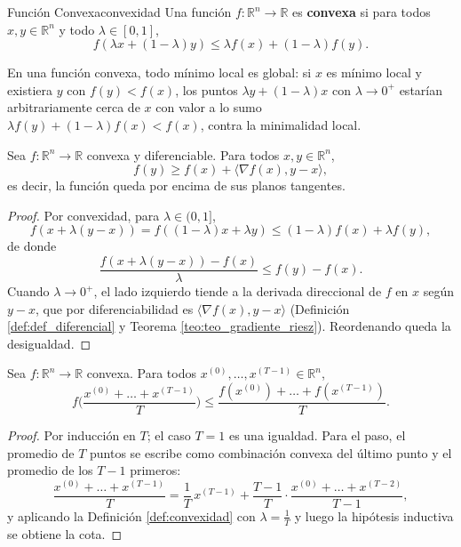 \documentclass[11pt, a4paper]{article}
\begin{document}
\begin{definicion}{Función Convexa}{convexidad}
Una función $f: \mathbb{R}^n \to \mathbb{R}$ es \textbf{convexa} si para todos $x, y \in \mathbb{R}^n$ y todo $\lambda \in [0, 1]$,
\[
f(\lambda x + (1 - \lambda) y) \le \lambda f(x) + (1 - \lambda) f(y).
\]
\end{definicion}

\obs En una función convexa, todo mínimo local es global: si $x$ es mínimo local y existiera $y$ con $f(y) < f(x)$, los puntos $\lambda y + (1-\lambda) x$ con $\lambda \to 0^+$ estarían arbitrariamente cerca de $x$ con valor a lo sumo $\lambda f(y) + (1-\lambda) f(x) < f(x)$, contra la minimalidad local.

\begin{lema}\label{lem_tangente}
Sea $f: \mathbb{R}^n \to \mathbb{R}$ convexa y diferenciable. Para todos $x, y \in \mathbb{R}^n$,
\[
f(y) \ge f(x) + \langle \nabla f(x), y - x \rangle,
\]
es decir, la función queda por encima de sus planos tangentes.
\end{lema}

\begin{proof}
Por convexidad, para $\lambda \in (0, 1]$,
\[
f(x + \lambda (y - x)) = f((1-\lambda) x + \lambda y) \le (1 - \lambda) f(x) + \lambda f(y),
\]
de donde
\[
\frac{f(x + \lambda (y - x)) - f(x)}{\lambda} \le f(y) - f(x).
\]
Cuando $\lambda \to 0^+$, el lado izquierdo tiende a la derivada direccional de $f$ en $x$ según $y - x$, que por diferenciabilidad es $\langle \nabla f(x), y - x \rangle$ (Definición \ref{def:def_diferencial} y Teorema \ref{teo:teo_gradiente_riesz}). Reordenando queda la desigualdad.
\end{proof}

\begin{lema}\label{lem_jensen}
Sea $f: \mathbb{R}^n \to \mathbb{R}$ convexa. Para todos $x^{(0)}, \dots, x^{(T-1)} \in \mathbb{R}^n$,
\[
f \Bigg( \frac{x^{(0)} + \dots + x^{(T-1)}}{T} \Bigg) \le \frac{f(x^{(0)}) + \dots + f(x^{(T-1)})}{T}.
\]
\end{lema}

\begin{proof}
Por inducción en $T$; el caso $T = 1$ es una igualdad. Para el paso, el promedio de $T$ puntos se escribe como combinación convexa del último punto y el promedio de los $T - 1$ primeros:
\[
\frac{x^{(0)} + \dots + x^{(T-1)}}{T} = \frac{1}{T} \, x^{(T-1)} + \frac{T-1}{T} \cdot \frac{x^{(0)} + \dots + x^{(T-2)}}{T-1},
\]
y aplicando la Definición \ref{def:convexidad} con $\lambda = \frac{1}{T}$ y luego la hipótesis inductiva se obtiene la cota.
\end{proof}
\end{document}
